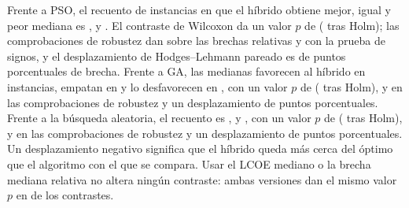 Frente a PSO, el recuento de instancias en que el híbrido obtiene mejor, igual y peor mediana es \CtrlPsoMedianWins, \CtrlPsoMedianTies{} y \CtrlPsoMedianLosses. El contraste de Wilcoxon da un valor $p$ de \CtrlPsoWilcoxonP{} (\CtrlPsoWilcoxonHolm{} tras Holm); las comprobaciones de robustez dan \CtrlPsoRelativeP{} sobre las brechas relativas y \CtrlPsoSignP{} con la prueba de signos, y el desplazamiento de Hodges--Lehmann pareado es de \CtrlPsoShift{} puntos porcentuales de brecha. Frente a GA, las medianas favorecen al híbrido en \CtrlGaMedianWins{} instancias, empatan en \CtrlGaMedianTies{} y lo desfavorecen en \CtrlGaMedianLosses, con un valor $p$ de \CtrlGaWilcoxonP{} (\CtrlGaWilcoxonHolm{} tras Holm), \CtrlGaRelativeP{} y \CtrlGaSignP{} en las comprobaciones de robustez y un desplazamiento de \CtrlGaShift{} puntos porcentuales. Frente a la búsqueda aleatoria, el recuento es \CtrlRandomMedianWins, \CtrlRandomMedianTies{} y \CtrlRandomMedianLosses, con un valor $p$ de \CtrlRandomWilcoxonP{} (\CtrlRandomWilcoxonHolm{} tras Holm), \CtrlRandomRelativeP{} y \CtrlRandomSignP{} en las comprobaciones de robustez y un desplazamiento de \CtrlRandomShift{} puntos porcentuales. Un desplazamiento negativo significa que el híbrido queda más cerca del óptimo que el algoritmo con el que se compara. Usar el LCOE mediano o la brecha mediana relativa no altera ningún contraste: ambas versiones dan el mismo valor $p$ en \PTwoSamePCount{} de los \StatTestsGlobal{} contrastes.

